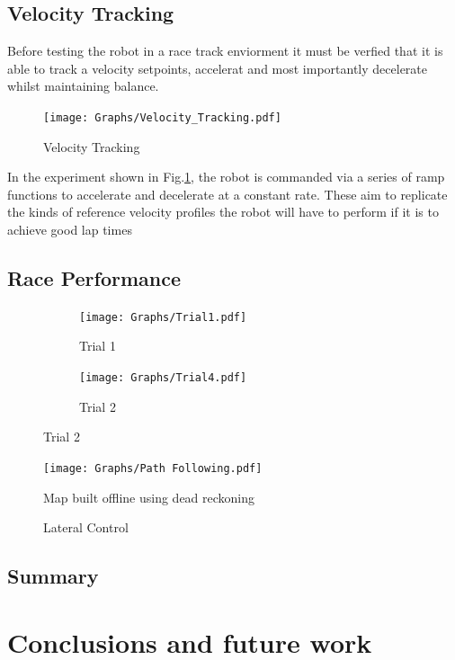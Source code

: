     \subsection{Velocity Tracking}

    Before testing the robot in a race track enviorment it must be verfied that it is able to track a velocity setpoints, accelerat and most 
    importantly decelerate whilst maintaining balance. 
    \begin{figure}[H]
        \centering
        \texttt{[image: Graphs/Velocity\_Tracking.pdf]}
        \caption{Velocity Tracking}
        \label{fig:VelocityTracking}
    \end{figure}

    In the experiment shown in Fig.\ref{fig:VelocityTracking}, the robot is commanded via a series of 
    ramp functions to accelerate and decelerate at a constant rate. These aim to replicate the kinds of reference velocity profiles 
    the robot will have to perform if it is to achieve good lap times
    \subsection{Race Performance}
            
    \begin{figure} [H]
        \centering
        \begin{subfigure}[b]{0.48\textwidth}
            \texttt{[image: Graphs/Trial1.pdf]}
            \caption{Trial 1}
            \label{fig:Trial1}
        \end{subfigure}
        \hfill
        \begin{subfigure}[b]{0.48\textwidth}
            \texttt{[image: Graphs/Trial4.pdf]}
            \caption{Trial 2}
            \label{fig:Trial2}
        \end{subfigure}
    \end{figure}


    \begin{figure}[H]
        \centering
        \texttt{[image: Graphs/Path Following.pdf]}
        \caption{Map built offline using dead reckoning}
        \caption{Lateral Control}
        \label{fig:TrajTrack}
    \end{figure} 

    \subsection{Summary}
  \section{Conclusions and future work} 

